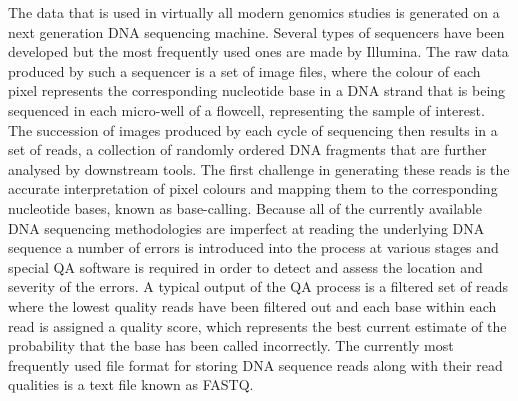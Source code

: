 The data that is used in virtually all modern genomics studies is generated on a next generation DNA sequencing machine. Several types of sequencers have been developed but the most frequently used ones are made by Illumina. The raw data produced by such a sequencer is a set of image files, where the colour of each pixel represents the corresponding nucleotide base in a DNA strand that is being sequenced in each micro-well of a flowcell, representing the sample of interest. The succession of images produced by each cycle of sequencing then results in a set of reads, a collection of randomly ordered DNA fragments that are further analysed by downstream tools. The first challenge in generating these reads is the accurate interpretation of pixel colours and mapping them to the corresponding nucleotide bases, known as base-calling\autocite{ledergerber2011base}. Because all of the currently available DNA sequencing methodologies are imperfect at reading the underlying DNA sequence a number of errors is introduced into the process at various stages and special QA software is required in order to detect and assess the location and severity of the errors\autocite{andrews2010fastqc}. A typical output of the QA process is a filtered set of reads where the lowest quality reads have been filtered out and each base within each read is assigned a quality score, which represents the best current estimate of the probability that the base has been called incorrectly. The currently most frequently used file format for storing DNA sequence reads along with their read qualities is a text file known as FASTQ.

